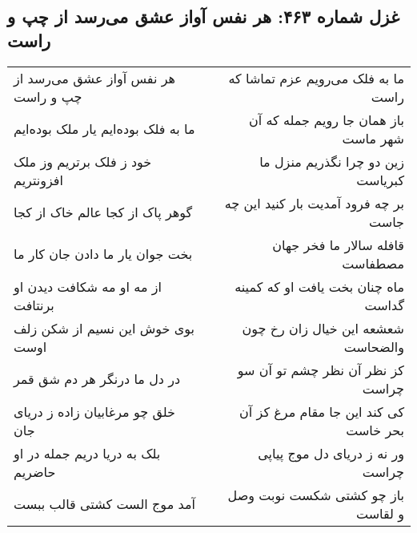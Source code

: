 \begin{center}
\section*{غزل شماره ۴۶۳: هر نفس آواز عشق می‌رسد از چپ و راست}
\label{sec:0463}
\begin{longtable}{l p{0.5cm} r}
هر نفس آواز عشق می‌رسد از چپ و راست
&&
ما به فلک می‌رویم عزم تماشا که راست
\\
ما به فلک بوده‌ایم یار ملک بوده‌ایم
&&
باز همان جا رویم جمله که آن شهر ماست
\\
خود ز فلک برتریم وز ملک افزونتریم
&&
زین دو چرا نگذریم منزل ما کبریاست
\\
گوهر پاک از کجا عالم خاک از کجا
&&
بر چه فرود آمدیت بار کنید این چه جاست
\\
بخت جوان یار ما دادن جان کار ما
&&
قافله سالار ما فخر جهان مصطفاست
\\
از مه او مه شکافت دیدن او برنتافت
&&
ماه چنان بخت یافت او که کمینه گداست
\\
بوی خوش این نسیم از شکن زلف اوست
&&
شعشعه این خیال زان رخ چون والضحاست
\\
در دل ما درنگر هر دم شق قمر
&&
کز نظر آن نظر چشم تو آن سو چراست
\\
خلق چو مرغابیان زاده ز دریای جان
&&
کی کند این جا مقام مرغ کز آن بحر خاست
\\
بلک به دریا دریم جمله در او حاضریم
&&
ور نه ز دریای دل موج پیاپی چراست
\\
آمد موج الست کشتی قالب ببست
&&
باز چو کشتی شکست نوبت وصل و لقاست
\\
\end{longtable}
\end{center}
